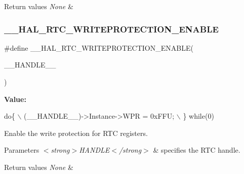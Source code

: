 \begin{DoxyRetVals}{Return values}
{\em None} & \\
\hline
\end{DoxyRetVals}
\mbox{\label{group___r_t_c___exported___macros_ga9eaed4a4db3b3232c1ca5d8ffa6ff4d8}} 
\subsubsection{\texorpdfstring{\+\_\+\+\_\+\+H\+A\+L\+\_\+\+R\+T\+C\+\_\+\+W\+R\+I\+T\+E\+P\+R\+O\+T\+E\+C\+T\+I\+O\+N\+\_\+\+E\+N\+A\+B\+LE}{\_\_HAL\_RTC\_WRITEPROTECTION\_ENABLE}}
{\footnotesize\ttfamily \#define \+\_\+\+\_\+\+H\+A\+L\+\_\+\+R\+T\+C\+\_\+\+W\+R\+I\+T\+E\+P\+R\+O\+T\+E\+C\+T\+I\+O\+N\+\_\+\+E\+N\+A\+B\+LE(\begin{DoxyParamCaption}\item[{}]{\+\_\+\+\_\+\+H\+A\+N\+D\+L\+E\+\_\+\+\_\+ }\end{DoxyParamCaption})}

{\bfseries Value\+:}
\begin{DoxyCode}
\textcolor{keywordflow}{do}\{                                       \(\backslash\)
                            (\_\_HANDLE\_\_)->Instance->WPR = 0xFFU;   \(\backslash\)
                          \} \textcolor{keywordflow}{while}(0)
\end{DoxyCode}


Enable the write protection for R\+TC registers. 


\begin{DoxyParams}{Parameters}
{\em $<$strong$>$\+H\+A\+N\+D\+L\+E$<$/strong$>$} & specifies the R\+TC handle. \\
\hline
\end{DoxyParams}

\begin{DoxyRetVals}{Return values}
{\em None} & \\
\hline
\end{DoxyRetVals}
